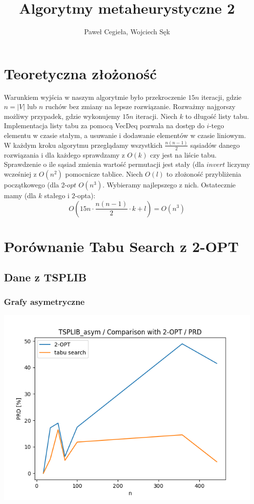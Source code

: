 \documentclass{article}
\title{Algorytmy metaheurystyczne 2}
\author{Paweł Cegieła, Wojciech Sęk}
\begin{document}
 

\maketitle

\section{Teoretyczna złożoność}
Warunkiem wyjścia w naszym algorytmie było przekroczenie $15n$ iteracji, gdzie $n=|V|$ lub $n$ ruchów bez zmiany na lepsze rozwiązanie. Rozważmy najgorszy możliwy przypadek, gdzie wykonujemy $15n$ iteracji. Niech $k$ to długość listy tabu. Implementacja listy tabu za pomocą VecDeq pozwala na dostęp do $i$-tego elementu w czasie stałym, a usuwanie i dodawanie elementów w czasie liniowym.
\\
W każdym kroku algorytmu przeglądamy wszystkich $\frac{n(n-1)}{2}$ sąsiadów danego rozwiązania i dla każdego sprawdzamy z $O(k)$ czy jest na liście tabu. Sprawdzenie o ile sąsiad zmienia wartość permutacji jest stały (dla $invert$ liczymy wcześniej z $O(n^2)$ pomocnicze tablice. Niech $O(l)$ to złożoność przybliżenia początkowego (dla 
2-$opt$ $O(n^3)$. Wybieramy najlepszego z nich. Ostatecznie mamy (dla $k$ stałego i  $2$-opta):
$$O\left(15n\cdot \frac{n(n-1)}{2} \cdot k + l\right)=O(n^3)$$


\section{Porównanie Tabu Search z 2-OPT}

\subsection{Dane z TSPLIB}

\subsubsection{Grafy asymetryczne}
\begin{center}
\includegraphics[width=\textwidth, 
                   height = 0.4\textheight, 
                   keepaspectratio]
                  {plots/two_opt_tsplib_asym_prd} 
\end{center}
\end{document}
